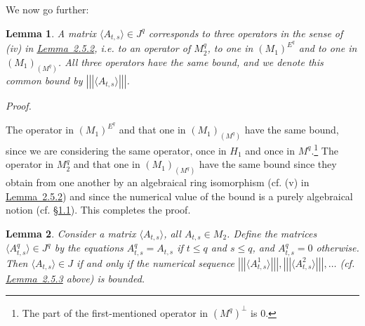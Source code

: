 \documentclass[b5paper,twoside]{article}
\newcommand{\secref}[2]{\hyperref[#1]{\mbox{\S#2}}}
\newcommand{\lemref}[2]{\hyperref[#1]{\mbox{Lemma~#2}}}
\theoremstyle{mvnplain}
\newtheorem{lemma}{Lemma}[section]
\renewenvironment{proof}[1][Proof]{%
  \par\addvspace{0.35\baselineskip}%
  \noindent\textit{#1.}\ \normalfont\ignorespaces
}{%
  \par\addvspace{0.35\baselineskip}%
}
\newcommand{\M}{\mathbf M}
\newcommand{\Hilbert}{\mathfrak H}
\newcommand{\OpNorm}[1]{\left\lvert\left\lvert\left\lvert#1\right\rvert\right\rvert\right\rvert}
\def\M{M}%
\def\Hilbert{H}%
\def\mathfrak#1{#1}%
\begin{document}
We now go further:
\begin{lemma}\label{lem:2.5.3}
A matrix $\langle A_{t,s}\rangle\in\mathfrak J^q$ corresponds to three
operators in the sense of (iv) in \lemref{lem:2.5.2}{2.5.2}, i.e. to an operator
of $\M_2^q$, to one in $(\M_1)^{E^q}$ and to one in
$(\M_1)_{(\mathfrak M^q)}$.  All three operators have the same bound, and we
denote this common bound by $\OpNorm{\langle A_{t,s}\rangle}$.
\end{lemma}
\begin{proof}
The operator in $(\M_1)^{E^q}$ and that one in
$(\M_1)_{(\mathfrak M^q)}$ have the same bound, since we are considering the
same operator, once in $\Hilbert_1$ and once in $\mathfrak M^q$.\footnote{The
part of the first-mentioned operator in $(\mathfrak M^q)^{\perp}$ is $0$.}
The operator in $\M_2^q$ and that one in $(\M_1)_{(\mathfrak M^q)}$ have the
same bound since they obtain from one another by an algebraical ring isomorphism
(cf. (v) in \lemref{lem:2.5.2}{2.5.2}) and since the numerical value of the
bound is a purely algebraical notion (cf. \secref{sec:1.1}{1.1}).  This
completes the proof.
\end{proof}
\begin{lemma}\label{lem:2.5.4}
Consider a matrix $\langle A_{t,s}\rangle$, all $A_{t,s}\in\M_2$.  Define
the matrices $\langle A^q_{t,s}\rangle\in\mathfrak J^q$ by the equations
$A^q_{t,s}=A_{t,s}$ if $t\leq q$ and $s\leq q$, and $A^q_{t,s}=0$
otherwise.  Then $\langle A_{t,s}\rangle\in\mathfrak J$ if and only if the
numerical sequence
$\OpNorm{\langle A^1_{t,s}\rangle},
 \OpNorm{\langle A^2_{t,s}\rangle},\ldots$
(cf. \lemref{lem:2.5.3}{2.5.3} above) is bounded.
\end{lemma}
\end{document}
